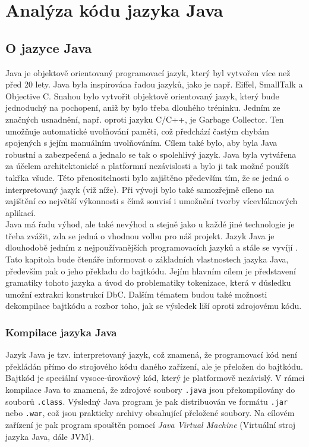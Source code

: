 \chapter{Analýza kódu jazyka Java}

	\section{O jazyce Java}
		Java \cite{javaEnviroment} je objektově orientovaný programovací jazyk, který byl vytvořen více než před 20 lety. Java byla inspirována řadou jazyků, jako je např. Eiffel, SmallTalk a Objective C. Snahou bylo vytvořit objektově orientovaný jazyk, který bude jednoduchý na pochopení, aniž by bylo třeba dlouhého tréninku. Jedním ze značných usnadnění, např. oproti jazyku C/C++, je Garbage Collector. Ten umožňuje automatické uvolňování paměti, což předchází častým chybám spojených s jejím manuálním uvolňováním.	Cílem také bylo, aby byla Java robustní a zabezpečená a jednalo se tak o spolehlivý jazyk. Java byla vytvářena za účelem architektonické a platformní nezávislosti a bylo ji tak možné použít takřka všude. Této přenositelnosti bylo zajištěno především tím, že se jedná o interpretovaný jazyk (viž níže). Při vývoji bylo také samozřejmě cíleno na zajištění co největší výkonnosti s čímž souvisí i umožnění tvorby vícevláknových aplikací.\\
		
		Java má řadu výhod, ale také nevýhod a stejně jako u každé jiné technologie je třeba zvážit, zda se jedná o vhodnou volbu pro náš projekt. Jazyk Java je dlouhodobě jedním z nejpoužívanějších programovacích jazyků a stále se vyvíjí \cite{javaTrend}.\\
		
		Tato kapitola bude čtenáře informovat o základních vlastnostech jazyka Java, především pak o jeho překladu do bajtkódu. Jejím hlavním cílem je představení gramatiky tohoto jazyka a úvod do problematiky tokenizace, která v důsledku umožní extrakci konstrukcí DbC. Dalším tématem budou také možnosti dekompilace bajtkódu a rozbor toho, jak se výsledek liší oproti zdrojovému kódu.
		
		
		\subsection{Kompilace jazyka Java}	
			Jazyk Java je tzv. interpretovaný jazyk, což znamená, že programovací kód není překládán přímo do strojového kódu daného zařízení, ale je přeložen do bajtkódu. Bajtkód je speciální vysoce-úrovňový kód, který je platformově nezávislý. V rámci kompilace Java to znamená, že zdrojové soubory \texttt{.java} jsou překompilovány do souborů \texttt{.class}. Výsledný Java program je pak distribuován ve formátu \texttt{.jar} nebo \texttt{.war}, což jsou prakticky archivy obsahující přeložené soubory. Na cílovém zařízení je pak program spouštěn pomocí \emph{Java Virtual Machine} (Virtuální stroj jazyka Java, dále JVM).
			
